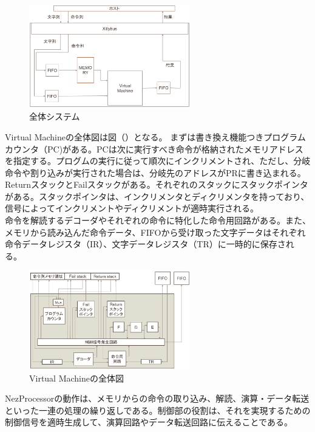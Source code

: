 \documentclass[paper]{ieicej}
\begin{document}
\begin{figure}[h]
    \begin{center}
        \includegraphics[width=70mm]{./fig/system}
      \caption{全体システム}
    \end{center}
\end{figure}

Virtual Machineの全体図は図（）となる。
まずは書き換え機能つきプログラムカウンタ（PC)がある。PCは次に実行すべき命令が格納されたメモリアドレスを指定する。プログムの実行に従って順次にインクリメントされ、ただし、分岐命令や割り込みが実行された場合は、分岐先のアドレスがPRに書き込まれる。\\
ReturnスタックとFailスタックがある。それぞれのスタックにスタックポインタがある。スタックポインタは、インクリメンタとディクリメンタを持っており、信号によってインクリメントやディクリメントが適時実行される。\\
命令を解読するデコーダやそれぞれの命令に特化した命令用回路がある。また、メモリから読み込んだ命令データ、FIFOから受け取った文字データはそれぞれ命令データレジスタ（IR）、文字データレジスタ（TR）に一時的に保存される。

\begin{figure}[h]
    \begin{center}
        \includegraphics[width=70mm]{./fig/circuit}
       \caption{Virtual Machineの全体図 }
    \end{center}
\end{figure}

NezProcessorの動作は、メモリからの命令の取り込み、解読、演算・データ転送といった一連の処理の繰り返しである。制御部の役割は、それを実現するための制御信号を適時生成して、演算回路やデータ転送回路に伝えることである。
\end{document}
